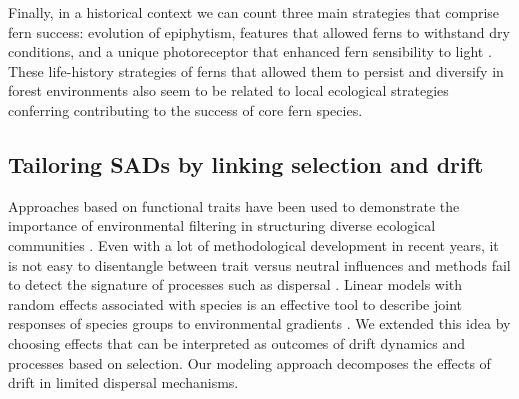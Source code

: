 \documentclass[12pt]{article}
\begin{document}
Finally, in a historical context we can count three main strategies that comprise fern success: evolution of epiphytism, features that allowed ferns to withstand dry conditions, and a unique photoreceptor that enhanced fern sensibility to light \citep{Schneider2004, Schuettpelz2009}. These life-history strategies of ferns that allowed them to persist and diversify in forest environments also seem to be related to local ecological
strategies conferring contributing to the success of core fern species. 


\subsection*{Tailoring SADs by linking selection and drift}

Approaches based on functional traits have been used to demonstrate the importance of environmental  filtering  in  structuring  diverse  ecological communities \citep{lavorel2002predicting, Baraloto2012}. Even with a lot of methodological development in recent years, it is not easy to disentangle between trait versus neutral influences and methods fail to detect the signature of processes such as dispersal \citep{kembel2009disentangling}. 
Linear models with random effects associated with species is an effective tool to describe joint responses of species groups to environmental gradients \citep{Jackson2012, Brown2014}. We extended this idea by choosing effects that can be interpreted as outcomes of drift dynamics and processes based on selection. Our modeling approach  decomposes the effects of drift in limited dispersal mechanisms.
\end{document}

